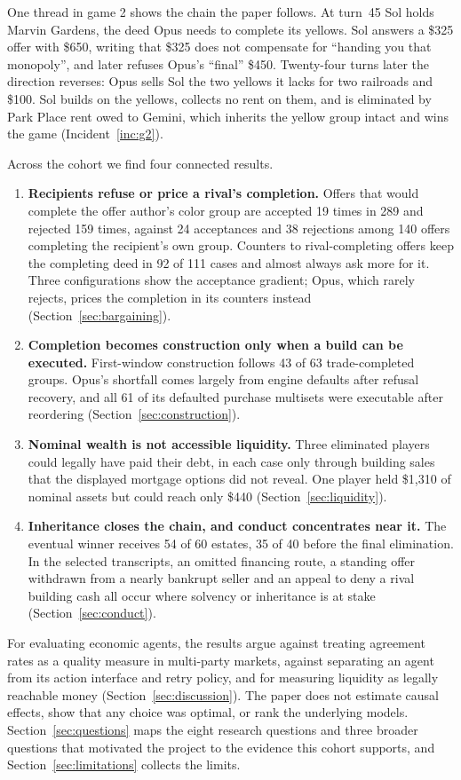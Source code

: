 One thread in game 2 shows the chain the paper follows. At turn~45 Sol holds Marvin Gardens, the deed Opus needs to complete its yellows. Sol answers a \$325 offer with \$650, writing that \$325 does not compensate for ``handing you that monopoly'', and later refuses Opus's ``final'' \$450. Twenty-four turns later the direction reverses: Opus sells Sol the two yellows it lacks for two railroads and \$100. Sol builds on the yellows, collects no rent on them, and is eliminated by Park Place rent owed to Gemini, which inherits the yellow group intact and wins the game (Incident~\ref{inc:g2}).

Across the cohort we find four connected results.
\begin{enumerate}
\item \textbf{Recipients refuse or price a rival's completion.} Offers that would complete the offer author's color group are accepted 19 times in 289 and rejected 159 times, against 24 acceptances and 38 rejections among 140 offers completing the recipient's own group. Counters to rival-completing offers keep the completing deed in 92 of 111 cases and almost always ask more for it. Three configurations show the acceptance gradient; Opus, which rarely rejects, prices the completion in its counters instead (Section~\ref{sec:bargaining}).
\item \textbf{Completion becomes construction only when a build can be executed.} First-window construction follows 43 of 63 trade-completed groups. Opus's shortfall comes largely from engine defaults after refusal recovery, and all 61 of its defaulted purchase multisets were executable after reordering (Section~\ref{sec:construction}).
\item \textbf{Nominal wealth is not accessible liquidity.} Three eliminated players could legally have paid their debt, in each case only through building sales that the displayed mortgage options did not reveal. One player held \$1,310 of nominal assets but could reach only \$440 (Section~\ref{sec:liquidity}).
\item \textbf{Inheritance closes the chain, and conduct concentrates near it.} The eventual winner receives 54 of 60 estates, 35 of 40 before the final elimination. In the selected transcripts, an omitted financing route, a standing offer withdrawn from a nearly bankrupt seller and an appeal to deny a rival building cash all occur where solvency or inheritance is at stake (Section~\ref{sec:conduct}).
\end{enumerate}

For evaluating economic agents, the results argue against treating agreement rates as a quality measure in multi-party markets, against separating an agent from its action interface and retry policy, and for measuring liquidity as legally reachable money (Section~\ref{sec:discussion}). The paper does not estimate causal effects, show that any choice was optimal, or rank the underlying models. Section~\ref{sec:questions} maps the eight research questions and three broader questions that motivated the project to the evidence this cohort supports, and Section~\ref{sec:limitations} collects the limits.
